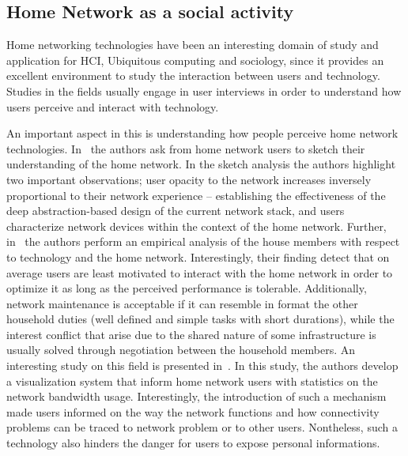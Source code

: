 \subsection{Home Network as a social activity} \label{s:home_social}

Home networking technologies have been an interesting domain of study and
application for HCI, Ubiquitous computing and sociology, since it
provides an excellent environment to study the interaction between users and
technology. Studies in the fields usually engage in user interviews in order to
understand how users perceive and interact with technology. 

An important aspect in this is understanding how people perceive home network
technologies.
In~\cite{shehanpoole08:_desig_inter_home_networ_maint_tools,grinter05:_work_make_home_networ_work}
the authors ask from home network users to sketch their understanding of the
home network. In the sketch analysis the authors highlight two important
observations; user opacity to the network increases inversely proportional to
their network experience -- establishing  the effectiveness of the deep
abstraction-based design of the current network stack, and users characterize
network devices within the context of the home network. Further,
in~\cite{tolmie07:_makin} the authors perform an empirical analysis of the house
members with respect to technology and the home network.  Interestingly, their
finding detect that on average users are least motivated to interact with the
home network in order to optimize it as long as the perceived performance is
tolerable. Additionally, network maintenance is acceptable if it can resemble in
format the other household duties (well defined and simple tasks with short
durations), while the interest conflict that arise due to the shared nature of
some infrastructure is usually solved through negotiation between the household
members. An interesting study on this field is presented in~\cite{Chetty10}. In
this study, the authors develop a visualization system that inform home network
users with statistics on the network bandwidth usage. Interestingly, the
introduction of such a mechanism made users informed on the way the network
functions and how connectivity problems can be traced to network problem or to
other users.  Nontheless, such a technology also hinders the danger for users to
expose personal informations. 

